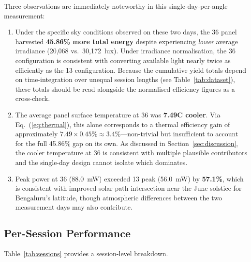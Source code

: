 \documentclass[conference]{IEEEtran}
\begin{document}
Three observations are immediately noteworthy in this single-day-per-angle measurement:
\begin{enumerate}
  \item Under the specific sky conditions observed on these two days, the 36\degree{} panel
        harvested \textbf{45.86\% more total energy} despite experiencing \textit{lower}
        average irradiance (20{,}068 vs.\ 30{,}172~lux). Under irradiance normalisation, the
        36\degree{} configuration is consistent with converting available light nearly twice as
        efficiently as the 13\degree{} configuration. Because the cumulative yield totals depend
        on time-integration over unequal session lengths (see Table~\ref{tab:dataset}), these
        totals should be read alongside the normalised efficiency figures as a cross-check.
  \item The average panel surface temperature at 36\degree{} was \textbf{7.49\degree{}C cooler}.
        Via Eq.~(\ref{eq:thermal}), this alone corresponds to a thermal efficiency gain of
        approximately $7.49 \times 0.45\% \approx 3.4\%$---non-trivial but insufficient to
        account for the full 45.86\% gap on its own. As discussed in Section~\ref{sec:discussion},
        the cooler temperature at 36\degree{} is consistent with multiple plausible contributors
        and the single-day design cannot isolate which dominates.
  \item Peak power at 36\degree{} (88.0~mW) exceeded 13\degree{} peak (56.0~mW) by
        \textbf{57.1\%}, which is consistent with improved solar path intersection near the
        June solstice for Bengaluru's latitude, though atmospheric differences between the
        two measurement days may also contribute.
\end{enumerate}

\subsection{Per-Session Performance}

Table~\ref{tab:sessions} provides a session-level breakdown.
\end{document}
